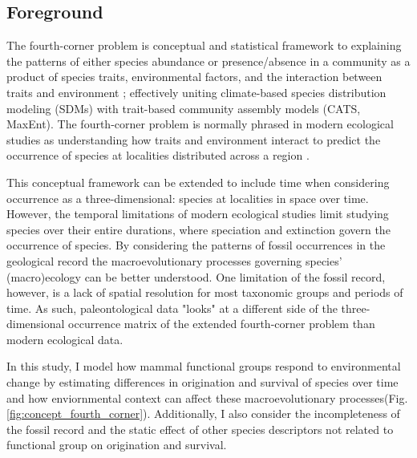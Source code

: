 \documentclass[12pt,letterpaper]{article}
\begin{document}
\subsection*{Foreground}

The fourth-corner problem is conceptual and statistical framework to explaining the patterns of either species abundance or presence/absence in a community as a product of species traits, environmental factors, and the interaction between traits and environment \citep{Brown2014c,Warton2015a,Pollock2012,Jamil2013}; effectively uniting climate-based species distribution modeling (SDMs) with trait-based community assembly models (CATS, MaxEnt). The fourth-corner problem is normally phrased in modern ecological studies as understanding how traits and environment interact to predict the occurrence of species at localities distributed across a region \citep{Pollock2012,Jamil2013}. 

This conceptual framework can be extended to include time when considering occurrence as a three-dimensional: species at localities in space over time. However, the temporal limitations of modern ecological studies limit studying species over their entire durations, where speciation and extinction govern the occurrence of species. By considering the patterns of fossil occurrences in the geological record the macroevolutionary processes governing species' (macro)ecology can be better understood. One limitation of the fossil record, however, is a lack of spatial resolution for most taxonomic groups and periods of time. As such, paleontological data "looks" at a different side of the three-dimensional occurrence matrix of the extended fourth-corner problem than modern ecological data.

In this study, I model how mammal functional groups respond to environmental change by estimating differences in origination and survival of species over time and how enviornmental context can affect these macroevolutionary processes(Fig. \ref{fig:concept_fourth_corner}). Additionally, I also consider the incompleteness of the fossil record and the static effect of other species descriptors not related to functional group on origination and survival. 
\end{document}
